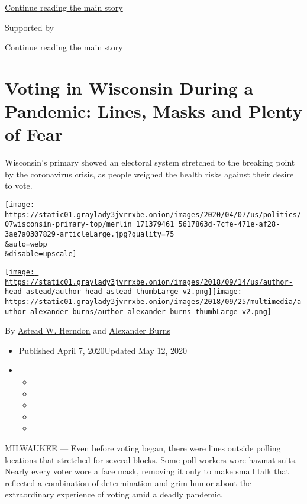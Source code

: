 \protect\hyperlink{after-top}{Continue reading the main story}

Supported by

\protect\hyperlink{after-sponsor}{Continue reading the main story}

\hypertarget{voting-in-wisconsin-during-a-pandemic-lines-masks-and-plenty-of-fear}{%
\section{Voting in Wisconsin During a Pandemic: Lines, Masks and Plenty
of
Fear}\label{voting-in-wisconsin-during-a-pandemic-lines-masks-and-plenty-of-fear}}

Wisconsin's primary showed an electoral system stretched to the breaking
point by the coronavirus crisis, as people weighed the health risks
against their desire to vote.

\texttt{[image: https://static01.graylady3jvrrxbe.onion/images/2020/04/07/us/politics/07wisconsin-primary-top/merlin\_171379461\_5617863d-7cfe-471e-af28-3ae7a0307829-articleLarge.jpg?quality=75\\\&auto=webp\\\&disable=upscale]}

\href{https://www.nytimes3xbfgragh.onion/by/astead-w-herndon}{\texttt{[image: https://static01.graylady3jvrrxbe.onion/images/2018/09/14/us/author-head-astead/author-head-astead-thumbLarge-v2.png]}}\href{https://www.nytimes3xbfgragh.onion/by/alexander-burns}{\texttt{[image: https://static01.graylady3jvrrxbe.onion/images/2018/09/25/multimedia/author-alexander-burns/author-alexander-burns-thumbLarge-v2.png]}}

By \href{https://www.nytimes3xbfgragh.onion/by/astead-w-herndon}{Astead
W. Herndon} and
\href{https://www.nytimes3xbfgragh.onion/by/alexander-burns}{Alexander
Burns}

\begin{itemize}
\item
  Published April 7, 2020Updated May 12, 2020
\item
  \begin{itemize}
  \item
  \item
  \item
  \item
  \item
  \end{itemize}
\end{itemize}

MILWAUKEE --- Even before voting began, there were lines outside polling
locations that stretched for several blocks. Some poll workers wore
hazmat suits. Nearly every voter wore a face mask, removing it only to
make small talk that reflected a combination of determination and grim
humor about the extraordinary experience of voting amid a deadly
pandemic.


